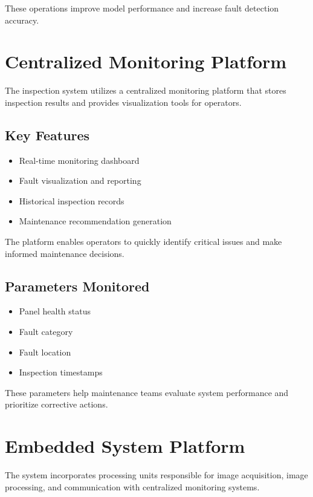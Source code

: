 These operations improve model performance and increase fault detection accuracy.

\section{Centralized Monitoring Platform}

The inspection system utilizes a centralized monitoring platform that stores inspection results and provides visualization tools for operators.

\subsection{Key Features}

\begin{itemize}
\item Real-time monitoring dashboard
\item Fault visualization and reporting
\item Historical inspection records
\item Maintenance recommendation generation
\end{itemize}

The platform enables operators to quickly identify critical issues and make informed maintenance decisions.

\subsection{Parameters Monitored}

\begin{itemize}
\item Panel health status
\item Fault category
\item Fault location
\item Inspection timestamps
\end{itemize}

These parameters help maintenance teams evaluate system performance and prioritize corrective actions.

\section{Embedded System Platform}

The system incorporates processing units responsible for image acquisition, image processing, and communication with centralized monitoring systems.

